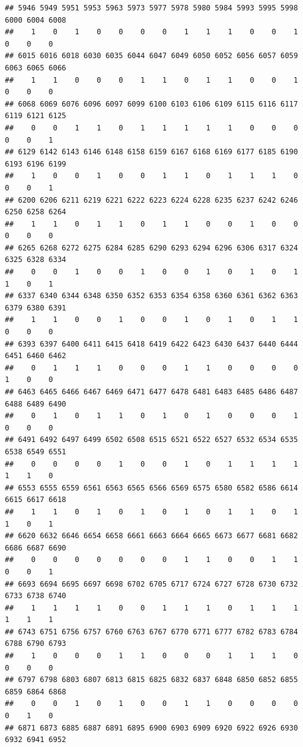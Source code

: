 \documentclass[
]{article}
\begin{document}
\begin{verbatim}
## 5946 5949 5951 5953 5963 5973 5977 5978 5980 5984 5993 5995 5998 6000 6004 6008 
##    1    0    1    0    0    0    0    1    1    1    0    0    1    0    0    0 
## 6015 6016 6018 6030 6035 6044 6047 6049 6050 6052 6056 6057 6059 6063 6065 6066 
##    1    1    0    0    0    1    1    0    1    1    0    0    1    0    0    0 
## 6068 6069 6076 6096 6097 6099 6100 6103 6106 6109 6115 6116 6117 6119 6121 6125 
##    0    0    1    1    0    1    1    1    1    1    0    0    0    0    0    1 
## 6129 6142 6143 6146 6148 6158 6159 6167 6168 6169 6177 6185 6190 6193 6196 6199 
##    1    0    0    1    0    0    1    1    0    1    1    1    0    0    0    1 
## 6200 6206 6211 6219 6221 6222 6223 6224 6228 6235 6237 6242 6246 6250 6258 6264 
##    1    1    0    1    1    0    1    1    0    0    1    0    0    0    0    0 
## 6265 6268 6272 6275 6284 6285 6290 6293 6294 6296 6306 6317 6324 6325 6328 6334 
##    0    0    1    0    0    1    0    0    1    0    1    0    1    1    0    1 
## 6337 6340 6344 6348 6350 6352 6353 6354 6358 6360 6361 6362 6363 6379 6380 6391 
##    1    1    0    0    1    0    0    1    0    1    0    1    1    0    0    0 
## 6393 6397 6400 6411 6415 6418 6419 6422 6423 6430 6437 6440 6444 6451 6460 6462 
##    0    1    1    1    0    0    0    1    1    0    0    0    0    1    0    0 
## 6463 6465 6466 6467 6469 6471 6477 6478 6481 6483 6485 6486 6487 6488 6489 6490 
##    0    1    0    1    1    0    1    0    1    0    0    0    1    0    0    0 
## 6491 6492 6497 6499 6502 6508 6515 6521 6522 6527 6532 6534 6535 6538 6549 6551 
##    0    0    0    0    1    0    0    1    0    1    1    1    1    1    1    0 
## 6553 6555 6559 6561 6563 6565 6566 6569 6575 6580 6582 6586 6614 6615 6617 6618 
##    1    1    0    1    0    1    0    1    0    1    1    0    1    1    0    1 
## 6620 6632 6646 6654 6658 6661 6663 6664 6665 6673 6677 6681 6682 6686 6687 6690 
##    0    0    0    0    0    0    0    1    1    0    0    1    1    0    0    1 
## 6693 6694 6695 6697 6698 6702 6705 6717 6724 6727 6728 6730 6732 6733 6738 6740 
##    1    1    1    1    0    0    1    1    1    0    1    1    1    1    1    1 
## 6743 6751 6756 6757 6760 6763 6767 6770 6771 6777 6782 6783 6784 6788 6790 6793 
##    1    0    0    0    1    1    0    0    0    1    1    1    0    0    0    0 
## 6797 6798 6803 6807 6813 6815 6825 6832 6837 6848 6850 6852 6855 6859 6864 6868 
##    0    0    1    0    1    0    0    1    1    0    0    0    0    0    1    0 
## 6871 6873 6885 6887 6891 6895 6900 6903 6909 6920 6922 6926 6930 6932 6941 6952 

\end{verbatim}
\end{document}
